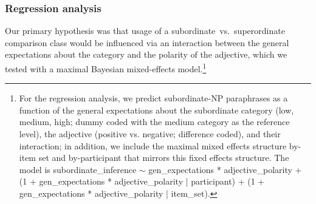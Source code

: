 \documentclass[doc, floatsintext]{apa6}
\newcommand{\red}[1]{\textcolor{Red}{#1}}
\newcommand{\mht}[1]{\textcolor{Blue}{[mht: #1]}}
\begin{document}


\subsubsection{Regression analysis}

Our primary hypothesis was that usage of a subordinate~vs.~superordinate comparison class would be influenced via an interaction between the general expectations about the category and the polarity of the adjective, which we tested with a maximal Bayesian mixed-effects model.\footnote{
	For the regression analysis, we predict subordinate-NP paraphrases as a function of the general expectations about the subordinate category (low, medium, high; dummy coded with the medium category as the reference level), the adjective (positive vs. negative; difference coded), and their interaction; in addition, we include the maximal mixed effects structure by-item set and by-participant that mirrors this fixed effects structure. The model is subordinate\_inference $\sim$ gen\_expectations * adjective\_polarity + (1 + gen\_expectations * adjective\_polarity | participant) + (1 + gen\_expectations * adjective\_polarity | item\_set).
}
\end{document}
